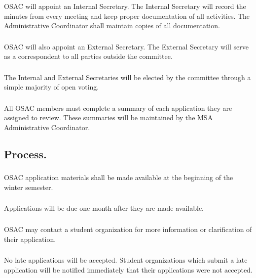 \subsubsection{}
OSAC will appoint an Internal Secretary.  The Internal Secretary will record the minutes from every meeting and keep proper documentation of all activities.  The Administrative Coordinator shall maintain copies of all documentation.
\subsubsection{}
OSAC will also appoint an External Secretary.  The External Secretary will serve as a correspondent to all parties outside the committee.
\subsubsection{}
The Internal and External Secretaries will be elected by the committee through a simple majority of open voting.
\subsubsection{}
All OSAC members must complete a summary of each application they are assigned to review.  These summaries will be maintained by the MSA Administrative Coordinator.

\subsection{Process.}
\subsubsection{}
OSAC application materials shall be made available at the beginning of the winter semester.  
\subsubsection{}
Applications will be due one month after they are made available.
\subsubsection{}
OSAC may contact a student organization for more information or clarification of their application.
\subsubsection{}
No late applications will be accepted.  Student organizations which submit a late application will be notified immediately that their applications were not accepted.

